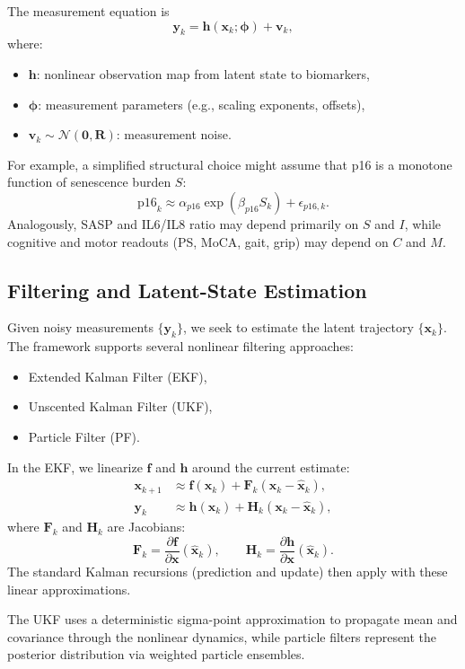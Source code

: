 \documentclass[11pt]{article}
\begin{document}
The measurement equation is
\[
  \bm{y}_k = \bm{h}(\bm{x}_k; \bm{\phi}) + \bm{v}_k,
\]
where:
\begin{itemize}[noitemsep]
  \item \(\bm{h}\): nonlinear observation map from latent state to biomarkers,
  \item \(\bm{\phi}\): measurement parameters (e.g., scaling exponents, offsets),
  \item \(\bm{v}_k \sim \mathcal{N}(\bm{0}, \bm{R})\): measurement noise.
\end{itemize}

For example, a simplified structural choice might assume that p16 is a monotone
function of senescence burden \(S\):
\[
  \text{p16}_k \approx \alpha_{p16} \exp(\beta_{p16} S_k) + \epsilon_{p16,k}.
\]
Analogously, SASP and IL6/IL8 ratio may depend primarily on \(S\) and \(I\), while
cognitive and motor readouts (PS, MoCA, gait, grip) may depend on \(C\) and \(M\).

\subsection{Filtering and Latent-State Estimation}

Given noisy measurements \(\{\bm{y}_k\}\), we seek to estimate the latent trajectory
\(\{\bm{x}_k\}\). The framework supports several nonlinear filtering approaches:
\begin{itemize}[noitemsep]
  \item Extended Kalman Filter (EKF),
  \item Unscented Kalman Filter (UKF),
  \item Particle Filter (PF).
\end{itemize}

In the EKF, we linearize \(\bm{f}\) and \(\bm{h}\) around the current estimate:
\begin{align*}
  \bm{x}_{k+1} &\approx \bm{f}(\bm{x}_k) + \bm{F}_k (\bm{x}_k - \hat{\bm{x}}_k), \\
  \bm{y}_k &\approx \bm{h}(\bm{x}_k) + \bm{H}_k (\bm{x}_k - \hat{\bm{x}}_k),
\end{align*}
where \(\bm{F}_k\) and \(\bm{H}_k\) are Jacobians:
\[
  \bm{F}_k = \frac{\partial \bm{f}}{\partial \bm{x}}(\hat{\bm{x}}_k), \qquad
  \bm{H}_k = \frac{\partial \bm{h}}{\partial \bm{x}}(\hat{\bm{x}}_k).
\]
The standard Kalman recursions (prediction and update) then apply with these linear
approximations.

The UKF uses a deterministic sigma-point approximation to propagate mean and
covariance through the nonlinear dynamics, while particle filters represent the
posterior distribution via weighted particle ensembles.
\end{document}
